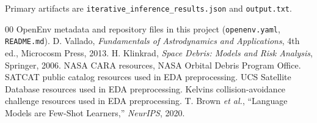 \documentclass[conference]{IEEEtran}
\begin{document}
Primary artifacts are \texttt{iterative\_inference\_results.json} and \texttt{output.txt}.

\begin{thebibliography}{00}
 OpenEnv metadata and repository files in this project (\texttt{openenv.yaml}, \texttt{README.md}).
 D. Vallado, \textit{Fundamentals of Astrodynamics and Applications}, 4th ed., Microcosm Press, 2013.
 H. Klinkrad, \textit{Space Debris: Models and Risk Analysis}, Springer, 2006.
 NASA CARA resources, NASA Orbital Debris Program Office.
 SATCAT public catalog resources used in EDA preprocessing.
 UCS Satellite Database resources used in EDA preprocessing.
 Kelvins collision-avoidance challenge resources used in EDA preprocessing.
 T. Brown \textit{et al.}, ``Language Models are Few-Shot Learners,'' \textit{NeurIPS}, 2020.
\end{thebibliography}
\end{document}

